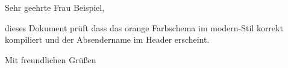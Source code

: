 \documentclass[modern, orange, lang=german]{../../onlinebrief24}
\begin{document}
\begin{letter}{}
\opening{Sehr geehrte Frau Beispiel,}

dieses Dokument prüft dass das orange Farbschema im modern-Stil korrekt
kompiliert und der Absendername im Header erscheint.

\closing{Mit freundlichen Grüßen}
\end{letter}
\end{document}
